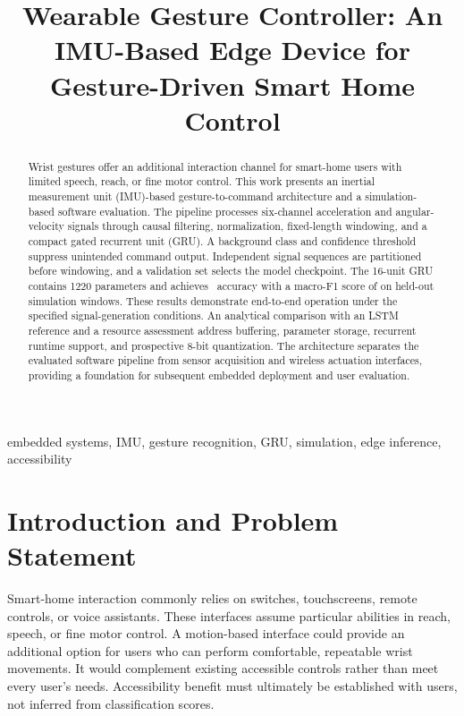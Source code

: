 \documentclass[conference]{IEEEtran}
\begin{document}
\title{Wearable Gesture Controller: An IMU-Based Edge Device for Gesture-Driven Smart Home Control}
\author{
}
\maketitle
\begin{abstract}
Wrist gestures offer an additional interaction channel for smart-home users with limited speech, reach, or fine motor control. This work presents an inertial measurement unit (IMU)-based gesture-to-command architecture and a simulation-based software evaluation. The pipeline processes six-channel acceleration and angular-velocity signals through causal filtering, normalization, fixed-length windowing, and a compact gated recurrent unit (GRU). A background class and confidence threshold suppress unintended command output. Independent signal sequences are partitioned before windowing, and a validation set selects the model checkpoint. The 16-unit GRU contains 1220 parameters and achieves \TestAccuracy\ accuracy with a macro-F1 score of \MacroFone{} on \TestWindows{} held-out simulation windows. These results demonstrate end-to-end operation under the specified signal-generation conditions. An analytical comparison with an LSTM reference and a resource assessment address buffering, parameter storage, recurrent runtime support, and prospective 8-bit quantization. The architecture separates the evaluated software pipeline from sensor acquisition and wireless actuation interfaces, providing a foundation for subsequent embedded deployment and user evaluation.
\end{abstract}
\begin{IEEEkeywords}
embedded systems, IMU, gesture recognition, GRU, simulation, edge inference, accessibility
\end{IEEEkeywords}

\section{Introduction and Problem Statement}
Smart-home interaction commonly relies on switches, touchscreens, remote controls, or voice assistants. These interfaces assume particular abilities in reach, speech, or fine motor control. A motion-based interface could provide an additional option for users who can perform comfortable, repeatable wrist movements. It would complement existing accessible controls rather than meet every user's needs. Accessibility benefit must ultimately be established with users, not inferred from classification scores.
\end{document}
